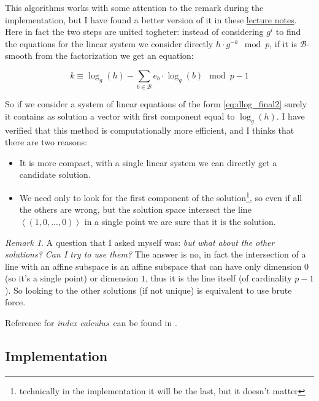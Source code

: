 \documentclass{article}
\newcommand{\BB}{\mathcal{B}}
\theoremstyle{plain}
\theoremstyle{remark}
\newtheorem{rem}{Remark}
\theoremstyle{definition}
\begin{document}
This algorithms works with some attention to the remark during the implementation, but I have found a better version of it in these \href{https://math.mit.edu/classes/18.783/2021/LectureNotes10.pdf}{lecture notes}. 
Here in fact the two steps are united togheter: instead of considering $g^i$ to find the equations for the linear system we consider directly $h\cdot g^{-k} \mod p$, if it is $\BB$-smooth from the factorization we get an equation:

\begin{equation}
	\label{eq:dlog_final2}
	k \equiv \log_g(h) - \sum_{b \in \BB} e_b \cdot \log_g(b) \mod p-1
\end{equation}

So if we consider a system of linear equations of the form \ref{eq:dlog_final2} surely it contains as solution a vector with first component equal to $\log_g(h)$. I have verified that this method is computationally more efficient, and I thinks that there are two reasons:
\begin{itemize}
	\item It is more compact, with a single linear system we can directly get a candidate solution. 
	\item We need only to look for the first component of the solution\footnote{technically in the implementation it will be the last, but it doesn't matter}, so even if all the others are wrong, but the solution space intersect the line $\left< (1,0,...,0)\right>$ in a single point we are sure that it is the solution. 
\end{itemize}

\begin{rem}
	A question that I asked myself was: \textit{but what about the other solutions? Can I try to use them?} The answer is no, in fact the intersection of a line with an affine subspace is an affine subspace that can have only dimension $0$ (so it's a single point) or dimension $1$, thus it is the line itself (of cardinality $p-1$). So looking to the other solutions (if not unique) is equivalent to use brute force.
\end{rem}

Reference for \textit{index calculus} can be found in \cite[Section 7.2.4]{stinson}.

\subsection{Implementation}
\end{document}
